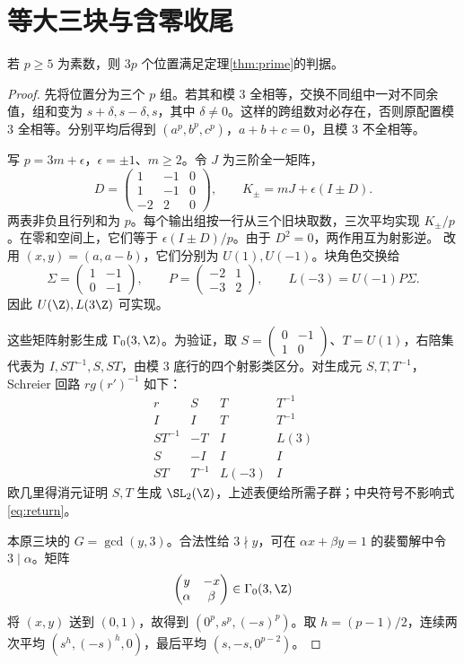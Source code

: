 \section{等大三块与含零收尾}\label{sec:blocks}
\begin{proposition}\label{prop:threep}
若 $p\ge5$ 为素数，则 $3p$ 个位置满足定理\ref{thm:prime}的判据。
\end{proposition}
\begin{proof}
先将位置分为三个 $p$ 组。若其和模 $3$ 全相等，交换不同组中一对不同余值，组和变为 $s+\delta,s-\delta,s$，其中 $\delta\ne0$。这样的跨组数对必存在，否则原配置模 $3$ 全相等。分别平均后得到 $(a^p,b^p,c^p)$，$a+b+c=0$，且模 $3$ 不全相等。

写 $p=3m+\epsilon$，$\epsilon=\pm1$、$m\ge2$。令 $J$ 为三阶全一矩阵，
\[
D=\begin{pmatrix}1&-1&0\\1&-1&0\\-2&2&0\end{pmatrix},\qquad
K_\pm=mJ+\epsilon(I\pm D).
\]
两表非负且行列和为 $p$。每个输出组按一行从三个旧块取数，三次平均实现 $K_\pm/p$。在零和空间上，它们等于 $\epsilon(I\pm D)/p$。由于 $D^2=0$，两作用互为射影逆。
改用 $(x,y)=(a,a-b)$，它们分别为 $U(1),U(-1)$。块角色交换给
\[
\Sigma=\begin{pmatrix}1&-1\\0&-1\end{pmatrix},\qquad
P=\begin{pmatrix}-2&1\\-3&2\end{pmatrix},\qquad
L(-3)=U(-1)P\Sigma.
\]
因此 $U(\Z),L(3\Z)$ 可实现。

这些矩阵射影生成 $\Gamma_0(3,\Z)$。为验证，取 $S=\left(\begin{smallmatrix}0&-1\\1&0\end{smallmatrix}\right)$、$T=U(1)$，右陪集代表为 $I,ST^{-1},S,ST$，由模 $3$ 底行的四个射影类区分。对生成元 $S,T,T^{-1}$，Schreier 回路 $rg(r')^{-1}$ 如下：
\[
\begin{array}{c|ccc}
r&S&T&T^{-1}\\\hline
I&I&T&T^{-1}\\
ST^{-1}&-T&I&L(3)\\
S&-I&I&I\\
ST&T^{-1}&L(-3)&I
\end{array}
\]
欧几里得消元证明 $S,T$ 生成 $\SL_2(\Z)$，上述表便给所需子群；中央符号不影响式\eqref{eq:return}。

本原三块的 $G=\gcd(y,3)$。合法性给 $3\nmid y$，可在 $\alpha x+\beta y=1$ 的裴蜀解中令 $3\mid\alpha$。矩阵
\[
\begin{pmatrix}y&-x\\\alpha&\beta\end{pmatrix}\in\Gamma_0(3,\Z)
\]
将 $(x,y)$ 送到 $(0,1)$，故得到 $(0^p,s^p,(-s)^p)$。取 $h=(p-1)/2$，连续两次平均 $(s^h,(-s)^h,0)$，最后平均 $(s,-s,0^{p-2})$。
\end{proof}

